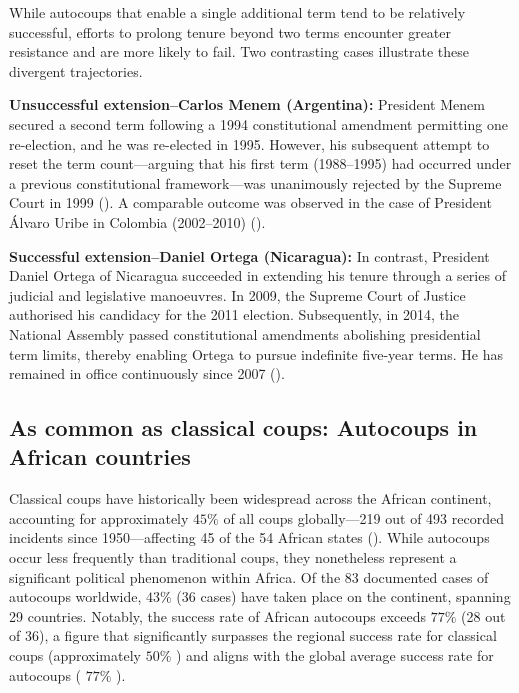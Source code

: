\documentclass[
  12pt,
]{report}
\begin{document}
While autocoups that enable a single additional term tend to be
relatively successful, efforts to prolong tenure beyond two terms
encounter greater resistance and are more likely to fail. Two
contrasting cases illustrate these divergent trajectories.

\textbf{Unsuccessful extension--Carlos Menem (Argentina):} President
Menem secured a second term following a 1994 constitutional amendment
permitting one re-election, and he was re-elected in 1995. However, his
subsequent attempt to reset the term count---arguing that his first term
(1988--1995) had occurred under a previous constitutional
framework---was unanimously rejected by the Supreme Court in 1999
(). A comparable outcome was
observed in the case of President Álvaro Uribe in Colombia (2002--2010)
().

\textbf{Successful extension--Daniel Ortega (Nicaragua):} In contrast,
President Daniel Ortega of Nicaragua succeeded in extending his tenure
through a series of judicial and legislative manoeuvres. In 2009, the
Supreme Court of Justice authorised his candidacy for the 2011 election.
Subsequently, in 2014, the National Assembly passed constitutional
amendments abolishing presidential term limits, thereby enabling Ortega
to pursue indefinite five-year terms. He has remained in office
continuously since 2007 ().

\subsection*{As common as classical coups: Autocoups in African
countries}\label{as-common-as-classical-coups-autocoups-in-african-countries}

Classical coups have historically been widespread across the African
continent, accounting for approximately \(45\%\) of all coups
globally---219 out of 493 recorded incidents since 1950---affecting 45
of the 54 African states (). While autocoups occur less frequently than traditional coups,
they nonetheless represent a significant political phenomenon within
Africa. Of the 83 documented cases of autocoups worldwide, \(43\%\) (36
cases) have taken place on the continent, spanning 29 countries.
Notably, the success rate of African autocoups exceeds \(77\%\) (28 out
of 36), a figure that significantly surpasses the regional success rate
for classical coups (approximately \(50\%\) ) and aligns with the global
average success rate for autocoups ( \(77\%\) ).
\end{document}
